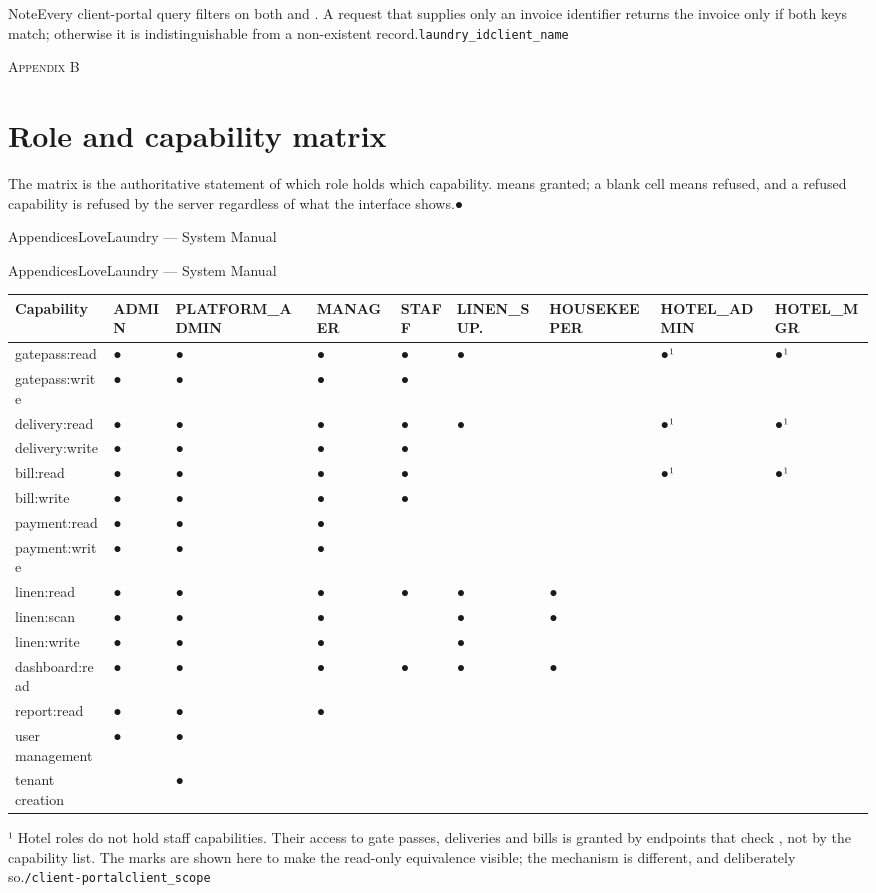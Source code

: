 \documentclass[11pt,a4paper,oneside]{book}
\begin{document}
\begin{notebox}NoteEvery client-portal query filters on both  and . A request that supplies only an invoice identifier returns the invoice only if both keys match; otherwise it is indistinguishable from a non-existent record.\texttt{laundry\_id}\texttt{client\_name}\end{notebox}
\textsc{\small\color{crimson}Appendix B}\par\medskip
\section*{Role and capability matrix}
The matrix is the authoritative statement of which role holds which capability.  means granted; a blank cell means refused, and a refused capability is refused by the server regardless of what the interface shows.●

AppendicesLoveLaundry — System Manual

AppendicesLoveLaundry — System Manual

\begin{center}\small
\begin{tabularx}{\linewidth}{|X|X|X|X|X|X|X|X|X|}
\hline
\rowcolor{lightgrey}
\textbf{Capability} & \textbf{ADMIN} & \textbf{PLATFORM\_ADMIN} & \textbf{MANAGER} & \textbf{STAFF} & \textbf{LINEN\_SUP.} & \textbf{HOUSEKEEPER} & \textbf{HOTEL\_ADMIN} & \textbf{HOTEL\_MGR} \\ \hline
gatepass:read & ● & ● & ● & ● & ● &  & ●¹ & ●¹ \\ \hline
gatepass:write & ● & ● & ● & ● &  &  &  &  \\ \hline
delivery:read & ● & ● & ● & ● & ● &  & ●¹ & ●¹ \\ \hline
delivery:write & ● & ● & ● & ● &  &  &  &  \\ \hline
bill:read & ● & ● & ● & ● &  &  & ●¹ & ●¹ \\ \hline
bill:write & ● & ● & ● & ● &  &  &  &  \\ \hline
payment:read & ● & ● & ● &  &  &  &  &  \\ \hline
payment:write & ● & ● & ● &  &  &  &  &  \\ \hline
linen:read & ● & ● & ● & ● & ● & ● &  &  \\ \hline
linen:scan & ● & ● & ● &  & ● & ● &  &  \\ \hline
linen:write & ● & ● & ● &  & ● &  &  &  \\ \hline
dashboard:read & ● & ● & ● & ● & ● & ● &  &  \\ \hline
report:read & ● & ● & ● &  &  &  &  &  \\ \hline
user management & ● & ● &  &  &  &  &  &  \\ \hline
tenant creation &  & ● &  &  &  &  &  &  \\ \hline
\end{tabularx}
\end{center}
¹ Hotel roles do not hold staff capabilities. Their access to gate passes, deliveries and bills is granted by  endpoints that check , not by the capability list. The marks are shown here to make the read-only equivalence visible; the mechanism is different, and deliberately so.\texttt{/client-portal}\texttt{client\_scope}
\end{document}
